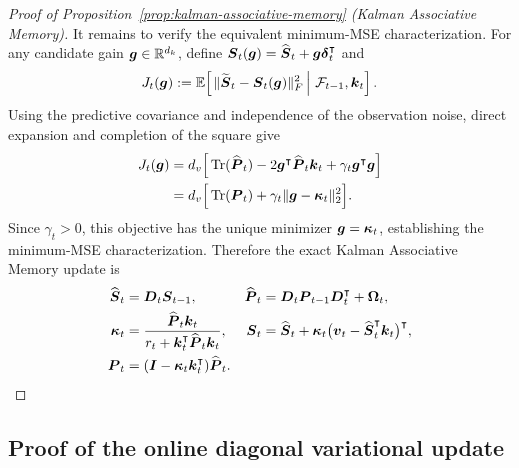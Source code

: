 \documentclass[11pt,letterpaper,logo]{yalearxiv}
\begin{document}
\begin{proof}[Proof of Proposition~\ref{prop:kalman-associative-memory} (Kalman Associative Memory)]
It remains to verify the equivalent minimum-MSE characterization. For any candidate gain
$\boldsymbol{g}\in\mathbb{R}^{d_k}$, define
$\boldsymbol{S}_t(\boldsymbol{g})=\widehat{\boldsymbol{S}}_t+\boldsymbol{g}\boldsymbol{\delta}_t^{\intercal}$ and
\begin{equation}
  J_t(\boldsymbol{g})
  :=\mathbb{E}\!\left[
    \left.
    \|\widetilde{\boldsymbol{S}}_t-\boldsymbol{S}_t(\boldsymbol{g})\|_F^2
    \,\right|\,\mathcal F_{t-1},\boldsymbol{k}_t
  \right].
  \label{eq:kam-mse-objective}
\end{equation}
Using the predictive covariance and independence of the observation noise, direct expansion and
completion of the square give
\begin{equation}
\begin{aligned}
  J_t(\boldsymbol{g})
  &=d_v\Big[
    \operatorname{Tr}(\widehat{\boldsymbol{P}}_t)
    -2\boldsymbol{g}^{\intercal}\widehat{\boldsymbol{P}}_t\boldsymbol{k}_t
    +\gamma_t\boldsymbol{g}^{\intercal}\boldsymbol{g}
  \Big] \\
  &=d_v\Big[
    \operatorname{Tr}(\boldsymbol{P}_t)
    +\gamma_t\|\boldsymbol{g}-\boldsymbol{\kappa}_t\|_2^2
  \Big].
\end{aligned}
  \label{eq:kam-mse-completed-square}
\end{equation}
Since $\gamma_t>0$, this objective has the unique minimizer
$\boldsymbol{g}=\boldsymbol{\kappa}_t$, establishing the minimum-MSE characterization.
Therefore the exact Kalman Associative Memory update is
\begin{equation}
\begin{aligned}
  \widehat{\boldsymbol{S}}_t
  &=\boldsymbol{D}_t\boldsymbol{S}_{t-1},
  &
  \widehat{\boldsymbol{P}}_t
  &=\boldsymbol{D}_t\boldsymbol{P}_{t-1}\boldsymbol{D}_t^{\intercal}+\boldsymbol{\Omega}_t,
  \\
  \boldsymbol{\kappa}_t
  &=
  \frac{\widehat{\boldsymbol{P}}_t\boldsymbol{k}_t}
  {r_t+\boldsymbol{k}_t^{\intercal}\widehat{\boldsymbol{P}}_t\boldsymbol{k}_t},
  &
  \boldsymbol{S}_t
  &=
  \widehat{\boldsymbol{S}}_t
  +
  \boldsymbol{\kappa}_t
  \big(\boldsymbol{v}_t-\widehat{\boldsymbol{S}}_t^{\intercal}\boldsymbol{k}_t\big)^{\intercal},
  \\
  \boldsymbol{P}_t
  &=
  (\boldsymbol{I}-\boldsymbol{\kappa}_t\boldsymbol{k}_t^{\intercal})\widehat{\boldsymbol{P}}_t.
\end{aligned}
\label{eq:kam-optimal-update}
\end{equation}
\end{proof}

\subsection{Proof of the online diagonal variational update}
\label{app:proof-diag-variational-inference}
\end{document}
